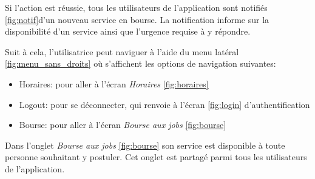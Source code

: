 Si l'action est réussie, tous les utilisateurs de l'application sont notifiés \ref{fig:notif}d'un 
nouveau service en bourse. La notification informe sur la disponibilité d'un service ainsi que 
l'urgence requise à y répondre.

Suit à cela, l'utilisatrice peut naviguer à l'aide du menu latéral \ref{fig:menu_sans_droits} où s'affichent les options
de navigation suivantes:
\smallskip
\begin{itemize}
    \item Horaires: pour aller à l'écran \textit{Horaires} \ref{fig:horaires}
    \item Logout: pour se déconnecter, qui renvoie à l'écran \ref{fig:login} d'authentification
    \item Bourse: pour aller à l'écran \textit{Bourse aux jobs} \ref{fig:bourse}
\end{itemize}

\newpage
Dans l'onglet \textit{Bourse aux jobs} \ref{fig:bourse} son service est disponible à toute personne souhaitant y postuler. 
Cet onglet est partagé parmi tous les utilisateurs de l'application.

